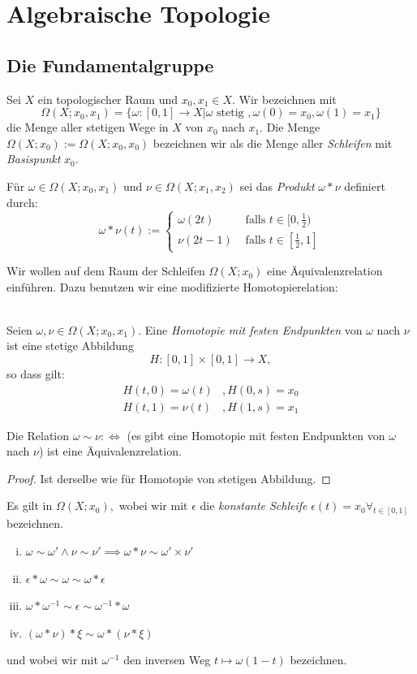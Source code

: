 \documentclass[a4paper,10pt]{scrartcl}
\begin{document}
\section{Algebraische Topologie}
\subsection{Die Fundamentalgruppe}
\begin{df}
 Sei $X$ ein topologischer Raum und $x_0, x_1 \in X$. Wir bezeichnen mit
\[
 \Omega(X; x_0,x_1)=\{\omega: [0,1]\to X|\omega \text{ stetig }, \omega(0)=x_0, \omega(1)=x_1 \}
\]
die Menge aller stetigen Wege in $X$ von $x_0$ nach $x_1$. \fixme[fig48]
Die Menge $\Omega(X; x_0):=\Omega(X; x_0, x_0)$ bezeichnen wir als die Menge aller \emph{Schleifen} mit \emph{Basispunkt} $x_0$.
\end{df}
\begin{df} Für $\omega\in \Omega(X; x_0, x_1)$ und $\nu\in \Omega(X; x_1, x_2)$ sei das \emph{Produkt} $\omega*\nu$ definiert durch:
 \[
  \omega*\nu(t):=\begin{cases} \omega(2t) &\text{ falls } t\in[0,\frac{1}{2})\\ \nu(2t-1) &\text{ falls } t\in[\frac{1}{2}, 1] \end{cases}
 \]
\fixme[fig49]
\end{df}
Wir wollen auf dem Raum der Schleifen $\Omega(X; x_0)$ eine Äquivalenzrelation einführen. Dazu benutzen wir eine modifizierte Homotopierelation:
\begin{df}
\fixme[fig50]\\
 Seien $\omega, \nu \in \Omega(X; x_0, x_1)$. Eine \emph{Homotopie mit festen Endpunkten} von $\omega$ nach $\nu$ ist eine stetige Abbildung
\[
 H: [0,1]\times [0,1] \to X,
\]
so dass gilt: 
\begin{align*}
 H(t,0)=\omega(t)&, H(0,s)=x_0\\
 H(t,1)=\nu(t)&, H(1,s)=x_1
\end{align*}
\end{df}
\begin{lem}
 Die Relation $\omega\sim \nu:\iff$ (es gibt eine Homotopie mit festen Endpunkten von $\omega$ nach $\nu$) ist eine Äquivalenzrelation.
\end{lem}
\begin{proof}
 Ist derselbe wie für Homotopie von stetigen Abbildung.
\end{proof}
\begin{lem}  \label{thm:2.1.5}
 Es gilt in $\Omega(X;x_0),$ wobei wir mit $\epsilon$ die \emph{konstante Schleife} 
$\epsilon(t)=x_0 \forall_{t\in [0,1]}$ bezeichnen.
\begin{enumerate}[(i)]
 \item $\omega \sim \omega' \land \nu \sim \nu' \implies \omega *\nu \sim \omega'\times \nu'$
  \item $\epsilon * \omega \sim \omega \sim \omega* \epsilon$ 
\item $\omega * \omega^{-1} \sim \epsilon \sim \omega^{-1}*\omega$
 \item $(\omega * \nu)*\xi \sim \omega*(\nu * \xi)$
\end{enumerate}
und wobei wir mit $\omega^{-1}$ den inversen Weg $t\mapsto \omega(1-t)$ bezeichnen.
\end{lem}
\end{document}
